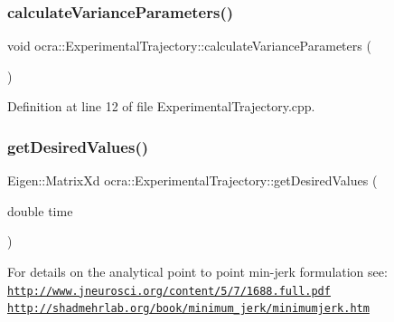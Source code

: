 \hypertarget{classocra_1_1ExperimentalTrajectory_a227d08649657b7951248c0b626808d9e}{}\label{classocra_1_1ExperimentalTrajectory_a227d08649657b7951248c0b626808d9e} 
\subsubsection{\texorpdfstring{calculate\+Variance\+Parameters()}{calculateVarianceParameters()}}
{\footnotesize\ttfamily void ocra\+::\+Experimental\+Trajectory\+::calculate\+Variance\+Parameters (\begin{DoxyParamCaption}{ }\end{DoxyParamCaption})}



Definition at line 12 of file Experimental\+Trajectory.\+cpp.

\hypertarget{classocra_1_1ExperimentalTrajectory_a9b9ed4d7b7a96c9a2b33624b5fc1ecf6}{}\label{classocra_1_1ExperimentalTrajectory_a9b9ed4d7b7a96c9a2b33624b5fc1ecf6} 
\subsubsection{\texorpdfstring{get\+Desired\+Values()}{getDesiredValues()}\hspace{0.1cm}{\footnotesize\ttfamily [1/3]}}
{\footnotesize\ttfamily Eigen\+::\+Matrix\+Xd ocra\+::\+Experimental\+Trajectory\+::get\+Desired\+Values (\begin{DoxyParamCaption}\item[{double}]{time }\end{DoxyParamCaption})\hspace{0.3cm}{\ttfamily [virtual]}}

For details on the analytical point to point min-\/jerk formulation see\+: \href{http://www.jneurosci.org/content/5/7/1688.full.pdf}{\tt http\+://www.\+jneurosci.\+org/content/5/7/1688.\+full.\+pdf} \href{http://shadmehrlab.org/book/minimum_jerk/minimumjerk.htm}{\tt http\+://shadmehrlab.\+org/book/minimum\+\_\+jerk/minimumjerk.\+htm}

